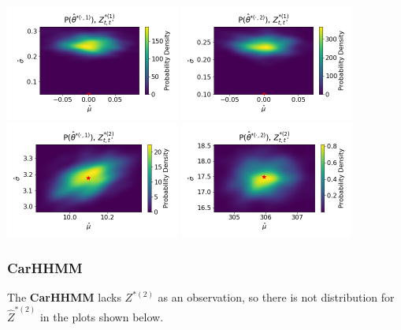 \documentclass[12pt]{TD-CJS}
\begin{document}
\includegraphics[width=2.25in]{../Plots/hhmm_FV_uncorr_MLE_density_A_0_0.png}
\includegraphics[width=2.25in]{../Plots/hhmm_FV_uncorr_MLE_density_A_0_1.png}
\includegraphics[width=2.25in]{../Plots/hhmm_FV_uncorr_MLE_density_FoVeDBA_0_0.png}
\includegraphics[width=2.25in]{../Plots/hhmm_FV_uncorr_MLE_density_FoVeDBA_0_1.png}


\newpage
\subsubsection{\textbf{CarHHMM}}

The \textbf{CarHHMM} lacks $Z^{*(2)}$ as an observation, so there is not distribution for $\hat Z^{*(2)}$ in the plots shown below.
\end{document}
